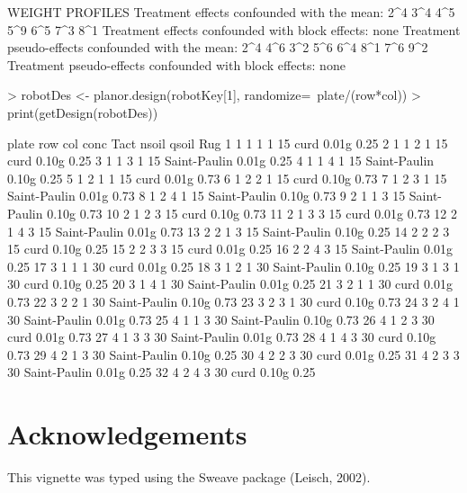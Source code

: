 \documentclass[a4paper]{article}
\begin{document}
\begin{Schunk}
\begin{Soutput}
WEIGHT PROFILES
Treatment effects confounded with the mean: 2^4 3^4 4^5 5^9 6^5 7^3 8^1 
Treatment effects confounded with block effects: none 
Treatment pseudo-effects confounded with the mean: 2^4 4^6 3^2 5^6 6^4 8^1 7^6 9^2 
Treatment pseudo-effects confounded with block effects: none
\end{Soutput}
\begin{Sinput}
> robotDes <- planor.design(robotKey[1], randomize=~plate/(row*col))
> print(getDesign(robotDes))
\end{Sinput}
\begin{Soutput}
   plate row col conc Tact        nsoil qsoil  Rug
1      1   1   1    1   15         curd 0.01g 0.25
2      1   1   2    1   15         curd 0.10g 0.25
3      1   1   3    1   15 Saint-Paulin 0.01g 0.25
4      1   1   4    1   15 Saint-Paulin 0.10g 0.25
5      1   2   1    1   15         curd 0.01g 0.73
6      1   2   2    1   15         curd 0.10g 0.73
7      1   2   3    1   15 Saint-Paulin 0.01g 0.73
8      1   2   4    1   15 Saint-Paulin 0.10g 0.73
9      2   1   1    3   15 Saint-Paulin 0.10g 0.73
10     2   1   2    3   15         curd 0.10g 0.73
11     2   1   3    3   15         curd 0.01g 0.73
12     2   1   4    3   15 Saint-Paulin 0.01g 0.73
13     2   2   1    3   15 Saint-Paulin 0.10g 0.25
14     2   2   2    3   15         curd 0.10g 0.25
15     2   2   3    3   15         curd 0.01g 0.25
16     2   2   4    3   15 Saint-Paulin 0.01g 0.25
17     3   1   1    1   30         curd 0.01g 0.25
18     3   1   2    1   30 Saint-Paulin 0.10g 0.25
19     3   1   3    1   30         curd 0.10g 0.25
20     3   1   4    1   30 Saint-Paulin 0.01g 0.25
21     3   2   1    1   30         curd 0.01g 0.73
22     3   2   2    1   30 Saint-Paulin 0.10g 0.73
23     3   2   3    1   30         curd 0.10g 0.73
24     3   2   4    1   30 Saint-Paulin 0.01g 0.73
25     4   1   1    3   30 Saint-Paulin 0.10g 0.73
26     4   1   2    3   30         curd 0.01g 0.73
27     4   1   3    3   30 Saint-Paulin 0.01g 0.73
28     4   1   4    3   30         curd 0.10g 0.73
29     4   2   1    3   30 Saint-Paulin 0.10g 0.25
30     4   2   2    3   30         curd 0.01g 0.25
31     4   2   3    3   30 Saint-Paulin 0.01g 0.25
32     4   2   4    3   30         curd 0.10g 0.25
\end{Soutput}
\end{Schunk}


\section*{Acknowledgements}
This vignette was typed using the Sweave package (Leisch, 2002\cite{sweave02}).



\end{document}
